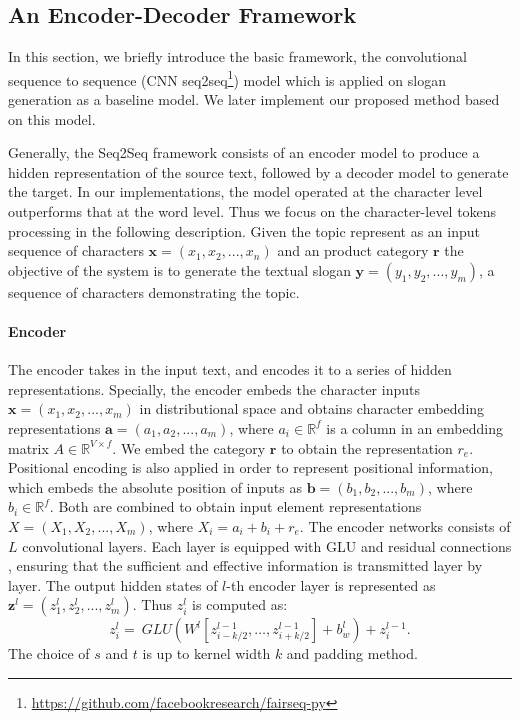 \subsection{An Encoder-Decoder Framework}
\label{sec:baseline}
In this section, we briefly introduce the basic framework, the convolutional sequence to sequence (CNN seq2seq\footnote{\url{https://github.com/facebookresearch/fairseq-py}}) model which is applied on slogan generation as a baseline model.
We later implement our proposed method based on this model.

Generally, the Seq2Seq framework consists of an encoder model to produce
a hidden representation of the source text, followed by a decoder model
to generate the target.
In our implementations, the model operated at the character level outperforms that at the word level. 
Thus we focus on the character-level tokens
processing in the following description.
Given the topic represent as an input sequence of characters
$\mathbf{ x } = (x_1, x_2, ..., x_n) $ and an product category $\mathbf{r}$
the objective of the system is to generate the textual slogan
$\mathbf{ y } = (y_1, y_2, ..., y_m) $,
a sequence of characters demonstrating the topic.


\paragraph{Encoder}
The encoder takes in the input text, and encodes it to a series of hidden 
representations.
Specially, the encoder embeds the character inputs 
$\textbf{x} = (x_{1},x_{2},...,x_{m})$ in distributional space
and obtains character embedding representations $\textbf{a} = (a_1, a_2, ..., a_m)$, 
where $a_i \in \mathbb{R}^f$ is a column in
an embedding matrix $A \in \mathbb{R}^{V\times f}$.
We embed the category $\mathbf{ r }$ to obtain the representation $r_e$.
Positional encoding is also applied in order to represent positional information,
which embeds the absolute position of inputs as $\textbf{b} = (b_1, b_2, ..., b_m)$,
where $b_i \in \mathbb{ R }^f$.
Both are combined to obtain input element representations $X = 
(X_1, X_2, ..., X_m)$, where $X_i = a_i+b_i+r_e$.
The encoder networks consists of $L$ convolutional layers.
Each layer is equipped with GLU \cite{DauphinFAG17} and residual connections \cite{HeZRS16},
ensuring that the sufficient and effective information is transmitted layer by layer.  
The output hidden states of $l$-th encoder layer is represented as 
$\textbf{z}^l = (z^l_1, z^l_2, ..., z^l_m)$.
Thus $z^l_i$ is computed as:
\begin{equation}
z _ { i } ^ { l } = ~ GLU \left( W ^ { l } \left[ z _ {i-k/2 } ^ { l - 1 } , \ldots , z _ { i+k/2 } ^ { l - 1 } \right] + b _ { w } ^ { l } \right)  + z _ { i } ^ { l - 1 }.
\end{equation}
The choice of $s$ and $t$ is up to kernel width $k$ and padding method.


